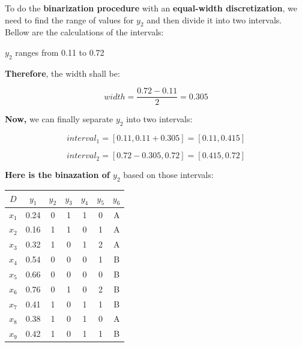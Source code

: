 \documentclass[12pt]{article}
\begin{document}
\begin{enumerate}[leftmargin=\labelsep]
\begin{enumerate}
          \vskip 0.3cm
          
          To do the \textbf{binarization procedure} with an \textbf{equal-width discretization}, we need to find the range of values
            for $y_2$ and then divide it into two intervals. Bellow are the calculations of the intervals:


          \begin{center}
            $y_2$ ranges from 0.11 to 0.72 
          \end{center}

          \textbf{Therefore}, the width shall be:

          \begin{equation*}
            width = \frac{0.72 - 0.11}{2} = 0.305
          \end{equation*}

          \textbf{Now,} we can finally separate $y_2$ into two intervals:

          \begin{equation*}
            interval_1 = [0.11, 0.11 + 0.305] = [0.11, 0.415]
          \end{equation*}

          \begin{equation*}
            interval_2 = [0.72 - 0.305, 0.72] = [0.415, 0.72]
          \end{equation*}

          \textbf{Here is the binazation of $y_2$} based on those intervals:
          \begin{center}
            \begin{tabular}{c|cccccc}
                \(D\) & \(y_1\) & \(y_2\) & \(y_3\) & \(y_4\) & \(y_5\) & \(y_6\)\\
                \hline
                \(x_1\) & 0.24 & 0 & 1 & 1 & 0 & A  \\
                \(x_2\) & 0.16 & 1 & 1 & 0 & 1 & A  \\
                \(x_3\) & 0.32 & 1 & 0 & 1 & 2 & A  \\
                \(x_4\) & 0.54 & 0 & 0 & 0 & 1 & B  \\
                \(x_5\) & 0.66 & 0 & 0 & 0 & 0 & B  \\
                \(x_6\) & 0.76 & 0 & 1 & 0 & 2 & B  \\
                \(x_7\) & 0.41 & 1 & 0 & 1 & 1 & B  \\
                \(x_8\) & 0.38 & 1 & 0 & 1 & 0 & A  \\
                \(x_9\) & 0.42 & 1 & 0 & 1 & 1 & B  \\
            \end{tabular}
          \end{center}


\end{enumerate}
\end{enumerate}
\end{document}
